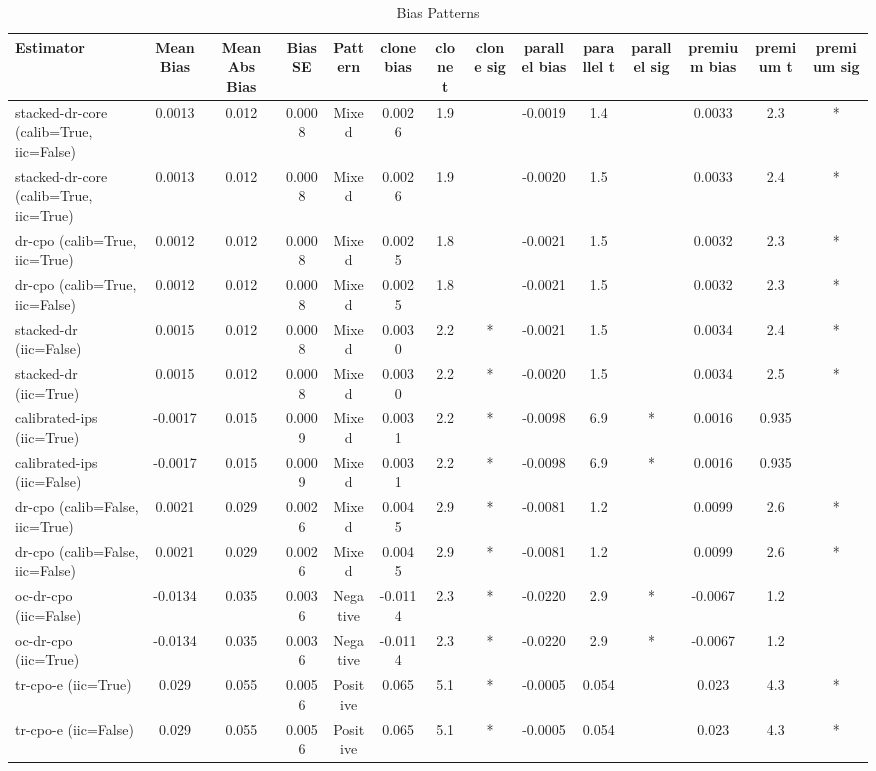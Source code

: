 \begin{table}[htbp]
\centering
\caption{Bias Patterns}
\label{tab:A2}
\begin{tabular}{l|ccccccccccccc}
\toprule
Estimator & Mean Bias & Mean Abs Bias & Bias SE & Pattern & clone bias & clone t & clone sig & parallel bias & parallel t & parallel sig & premium bias & premium t & premium sig \\
\midrule
stacked-dr-core (calib=True, iic=False) & 0.0013 & 0.012 & 0.0008 & Mixed & 0.0026 & 1.9 &  & -0.0019 & 1.4 &  & 0.0033 & 2.3 & * \\
stacked-dr-core (calib=True, iic=True) & 0.0013 & 0.012 & 0.0008 & Mixed & 0.0026 & 1.9 &  & -0.0020 & 1.5 &  & 0.0033 & 2.4 & * \\
dr-cpo (calib=True, iic=True) & 0.0012 & 0.012 & 0.0008 & Mixed & 0.0025 & 1.8 &  & -0.0021 & 1.5 &  & 0.0032 & 2.3 & * \\
dr-cpo (calib=True, iic=False) & 0.0012 & 0.012 & 0.0008 & Mixed & 0.0025 & 1.8 &  & -0.0021 & 1.5 &  & 0.0032 & 2.3 & * \\
stacked-dr (iic=False) & 0.0015 & 0.012 & 0.0008 & Mixed & 0.0030 & 2.2 & * & -0.0021 & 1.5 &  & 0.0034 & 2.4 & * \\
stacked-dr (iic=True) & 0.0015 & 0.012 & 0.0008 & Mixed & 0.0030 & 2.2 & * & -0.0020 & 1.5 &  & 0.0034 & 2.5 & * \\
calibrated-ips (iic=True) & -0.0017 & 0.015 & 0.0009 & Mixed & 0.0031 & 2.2 & * & -0.0098 & 6.9 & * & 0.0016 & 0.935 &  \\
calibrated-ips (iic=False) & -0.0017 & 0.015 & 0.0009 & Mixed & 0.0031 & 2.2 & * & -0.0098 & 6.9 & * & 0.0016 & 0.935 &  \\
dr-cpo (calib=False, iic=True) & 0.0021 & 0.029 & 0.0026 & Mixed & 0.0045 & 2.9 & * & -0.0081 & 1.2 &  & 0.0099 & 2.6 & * \\
dr-cpo (calib=False, iic=False) & 0.0021 & 0.029 & 0.0026 & Mixed & 0.0045 & 2.9 & * & -0.0081 & 1.2 &  & 0.0099 & 2.6 & * \\
oc-dr-cpo (iic=False) & -0.0134 & 0.035 & 0.0036 & Negative & -0.0114 & 2.3 & * & -0.0220 & 2.9 & * & -0.0067 & 1.2 &  \\
oc-dr-cpo (iic=True) & -0.0134 & 0.035 & 0.0036 & Negative & -0.0114 & 2.3 & * & -0.0220 & 2.9 & * & -0.0067 & 1.2 &  \\
tr-cpo-e (iic=True) & 0.029 & 0.055 & 0.0056 & Positive & 0.065 & 5.1 & * & -0.0005 & 0.054 &  & 0.023 & 4.3 & * \\
tr-cpo-e (iic=False) & 0.029 & 0.055 & 0.0056 & Positive & 0.065 & 5.1 & * & -0.0005 & 0.054 &  & 0.023 & 4.3 & * \\

\end{tabular}
\end{table}
